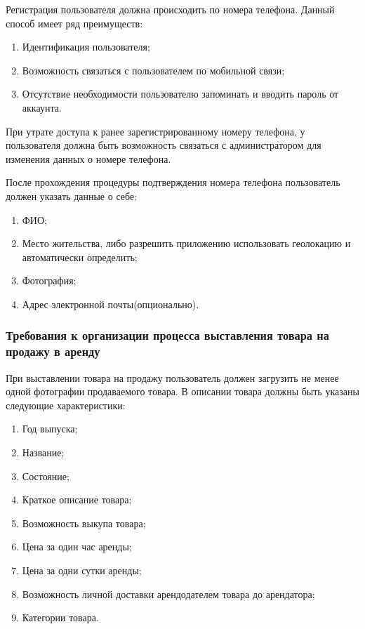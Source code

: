 Регистрация пользователя должна происходить по номера телефона. Данный способ имеет ряд преимуществ:
\begin{enumerate}[label=\arabic*)]
    \item Идентификация пользователя;
    \item Возможность связаться с пользователем по мобильной связи;
    \item Отсутствие необходимости пользователю запоминать и вводить пароль от аккаунта.
\end{enumerate}

При утрате доступа к ранее зарегистрированному номеру телефона, у пользователя должна быть возможность связаться с администратором для изменения данных о номере телефона.

После прохождения процедуры подтверждения номера телефона пользователь должен указать данные о себе:
\begin{enumerate}[label=\arabic*)]
    \item ФИО;
    \item Место жительства, либо разрешить приложению использовать геолокацию и автоматически определить;
    \item Фотография;
    \item Адрес электронной почты(опционально).
\end{enumerate}

\subsubsection{Требования к организации процесса выставления товара на продажу в аренду}

При выставлении товара на продажу пользователь должен загрузить не менее одной фотографии продаваемого товара.
В описании товара должны быть указаны следующие характеристики:
\begin{enumerate}[label=\arabic*)]
    \item Год выпуска;
    \item Название;
    \item Состояние;
    \item Краткое описание товара;
    \item Возможность выкупа товара;
    \item Цена за один час аренды;
    \item Цена за одни сутки аренды;
    \item Возможность личной доставки арендодателем товара до арендатора;
    \item Категории товара.
\end{enumerate}

